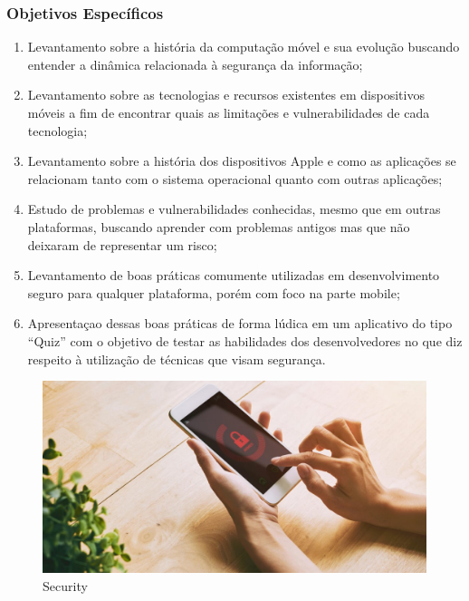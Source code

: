 \subsubsection{Objetivos Específicos}
\begin{enumerate}
    \item Levantamento sobre a história da computação móvel e sua evolução buscando entender a dinâmica relacionada à segurança da informação;
    \item Levantamento sobre as tecnologias e recursos existentes em dispositivos móveis a fim de encontrar quais as limitações e vulnerabilidades de cada tecnologia;
    \item Levantamento sobre a história dos dispositivos Apple e como as aplicações se relacionam tanto com o sistema operacional quanto com outras aplicações;
    \item Estudo de problemas e vulnerabilidades conhecidas, mesmo que em outras plataformas, buscando aprender com problemas antigos mas que não deixaram de representar um risco;
    \item Levantamento de boas práticas comumente utilizadas em desenvolvimento seguro para qualquer plataforma, porém com foco na parte mobile;
    \item Apresentaçao dessas boas práticas de forma lúdica em um aplicativo do tipo “Quiz” com o objetivo de testar as habilidades dos desenvolvedores no que diz respeito à utilização de técnicas que visam segurança.

\end{enumerate}

\begin{figure}[h]
\label{figura1}
\centering
\includegraphics[scale=0.4]{secoes/figuras/img.jpg}
\caption{Security}
\end{figure}